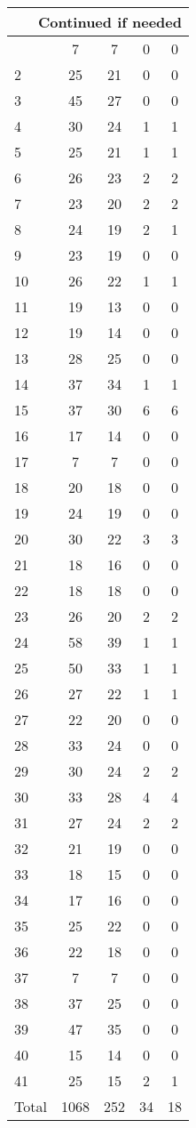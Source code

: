 \begin{center}
\begin{longtable}{l|c|c|c|c}
\hline \multicolumn{5}{|r|}{{Continued if needed}} \\ \hline
\endfoot 
1 & 7 & 7 & 0 & 0\\ \hline
2 & 25 & 21 & 0 & 0\\ \hline
3 & 45 & 27 & 0 & 0\\ \hline
4 & 30 & 24 & 1 & 1\\ \hline
5 & 25 & 21 & 1 & 1\\ \hline
6 & 26 & 23 & 2 & 2\\ \hline
7 & 23 & 20 & 2 & 2\\ \hline
8 & 24 & 19 & 2 & 1\\ \hline
9 & 23 & 19 & 0 & 0\\ \hline
10 & 26 & 22 & 1 & 1\\ \hline
11 & 19 & 13 & 0 & 0\\ \hline
12 & 19 & 14 & 0 & 0\\ \hline
13 & 28 & 25 & 0 & 0\\ \hline
14 & 37 & 34 & 1 & 1\\ \hline
15 & 37 & 30 & 6 & 6\\ \hline
16 & 17 & 14 & 0 & 0\\ \hline
17 & 7 & 7 & 0 & 0\\ \hline
18 & 20 & 18 & 0 & 0\\ \hline
19 & 24 & 19 & 0 & 0\\ \hline
20 & 30 & 22 & 3 & 3\\ \hline
21 & 18 & 16 & 0 & 0\\ \hline
22 & 18 & 18 & 0 & 0\\ \hline
23 & 26 & 20 & 2 & 2\\ \hline
24 & 58 & 39 & 1 & 1\\ \hline
25 & 50 & 33 & 1 & 1\\ \hline
26 & 27 & 22 & 1 & 1\\ \hline
27 & 22 & 20 & 0 & 0\\ \hline
28 & 33 & 24 & 0 & 0\\ \hline
29 & 30 & 24 & 2 & 2\\ \hline
30 & 33 & 28 & 4 & 4\\ \hline
31 & 27 & 24 & 2 & 2\\ \hline
32 & 21 & 19 & 0 & 0\\ \hline
33 & 18 & 15 & 0 & 0\\ \hline
34 & 17 & 16 & 0 & 0\\ \hline
35 & 25 & 22 & 0 & 0\\ \hline
36 & 22 & 18 & 0 & 0\\ \hline
37 & 7 & 7 & 0 & 0\\ \hline
38 & 37 & 25 & 0 & 0\\ \hline
39 & 47 & 35 & 0 & 0\\ \hline
40 & 15 & 14 & 0 & 0\\ \hline
41 & 25 & 15 & 2 & 1\\ \hline
\hline \hline
Total & 1068 & 252 & 34 & 18



\end{longtable}
\end{center}

